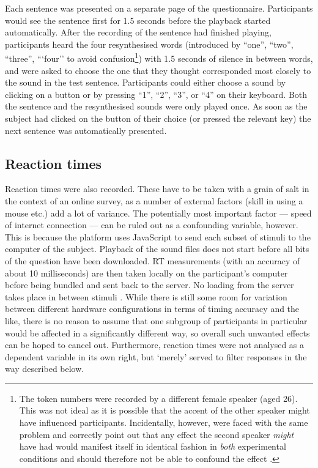 Each sentence was presented on a separate page of the questionnaire.
Participants would see the sentence first for 1.5 seconds before the playback started automatically.
After the recording of the sentence had finished playing, participants heard the four resynthesised words (introduced by ``one'', ``two'', ``three'', ```four'' to avoid confusion\footnote{The token numbers were recorded by a different female speaker (aged 26). This was not ideal as it is possible that the accent of the other speaker might have influenced participants. Incidentally, however, \citeauthor{haydrager2010} were faced with the same problem and correctly point out that any effect the second speaker \emph{might} have had would manifest itself in identical fashion in \emph{both} experimental conditions and should therefore not be able to confound the  effect \parencite[cf.][871 and 889]{haydrager2010}.}) with 1.5 seconds of silence in between words, and were asked to choose the one that they thought corresponded most closely to the sound in the test sentence.
Participants could either choose a sound by clicking on a button or by pressing ``1'', ``2'', ``3'', or ``4'' on their keyboard.
Both the sentence and the resynthesised sounds were only played once.
As soon as the subject had clicked on the button of their choice (or pressed the relevant key) the next sentence was automatically presented.

\subsection{Reaction times}
\label{sec.perc_method.pres.rt}

Reaction times were also recorded.
These have to be taken with a grain of salt in the context of an online survey, as a number of external factors (skill in using a mouse etc.) add a lot of variance.
The potentially most important factor --- speed of internet connection --- can be ruled out as a confounding variable, however.
This is because the platform uses JavaScript to send each subset of stimuli to the computer of the subject.
Playback of the sound files does not start before all bits of the question have been downloaded.
RT measurements (with an accuracy of about 10 milliseconds) are then taken locally on the participant's computer before being bundled and sent back to the server.
No loading from the server takes place in between stimuli \parencite[cf.][]{sosci}.
While there is still some room for variation between different hardware configurations in terms of timing accuracy and the like, there is no reason to assume that one subgroup of participants in particular would be affected in a significantly different way, so overall such unwanted effects can be hoped to cancel out.
Furthermore, reaction times were not analysed as a dependent variable in its own right, but `merely' served to filter responses in the way described below.

